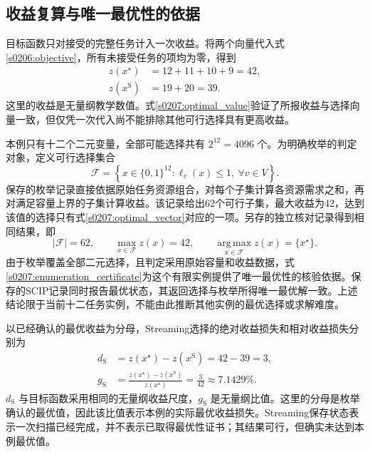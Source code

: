 \subsection{收益复算与唯一最优性的依据}

目标函数只对接受的完整任务计入一次收益。将两个向量代入式\eqref{s0206:objective}，所有未接受任务的项均为零，得到
\begin{align}
 z(x^{\star})&=12+11+10+9=42,
 \label{s0207:optimal_value}\\
 z(x^{\mathrm{S}})&=19+20=39.
 \label{s0207:streaming_value}
\end{align}
这里的收益是无量纲教学数值。式\eqref{s0207:optimal_value}验证了所报收益与选择向量一致，但仅凭一次代入尚不能排除其他可行选择具有更高收益。

本例只有十二个二元变量，全部可能选择共有 $2^{12}=4096$ 个。为明确枚举的判定对象，定义可行选择集合
\begin{equation}
 \mathcal{F}=\left\{x\in\{0,1\}^{12}:\ell_v(x)\leq1,\ \forall v\in V\right\}.
 \label{s0207:feasible_set}
\end{equation}
保存的枚举记录直接依据原始任务资源组合，对每个子集计算各资源需求之和，再对满足容量上界的子集计算收益。该记录给出62个可行子集，最大收益为42，达到该值的选择只有式\eqref{s0207:optimal_vector}对应的一项。另存的独立核对记录得到相同结果，即
\begin{equation}
 |\mathcal{F}|=62,\qquad
 \max_{x\in\mathcal{F}}z(x)=42,\qquad
 \operatorname*{arg\,max}_{x\in\mathcal{F}}z(x)=\{x^{\star}\}.
 \label{s0207:enumeration_certificate}
\end{equation}
由于枚举覆盖全部二元选择，且判定采用原始容量和收益数据，式\eqref{s0207:enumeration_certificate}为这个有限实例提供了唯一最优性的核验依据。保存的SCIP记录同时报告最优状态，其返回选择与枚举所得唯一最优解一致。上述结论限于当前十二任务实例，不能由此推断其他实例的最优选择或求解难度。

以已经确认的最优收益为分母，Streaming选择的绝对收益损失和相对收益损失分别为
\begin{align}
 d_{\mathrm{S}}&=z(x^{\star})-z(x^{\mathrm{S}})=42-39=3,
 \label{s0207:absolute_loss}\\
 g_{\mathrm{S}}&=\frac{z(x^{\star})-z(x^{\mathrm{S}})}{z(x^{\star})}
 =\frac{3}{42}\approx7.1429\%.
 \label{s0207:relative_loss}
\end{align}
$d_{\mathrm{S}}$ 与目标函数采用相同的无量纲收益尺度，$g_{\mathrm{S}}$ 是无量纲比值。这里的分母是枚举确认的最优值，因此该比值表示本例的实际最优收益损失。Streaming保存状态表示一次扫描已经完成，并不表示已取得最优性证书；其结果可行，但确实未达到本例最优值。

